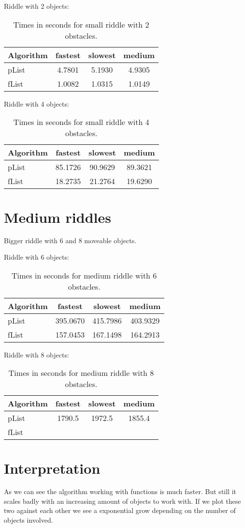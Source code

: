\begin{figure}[H]
\end{figure}
Riddle with 2 objects:
\begin{table}
\centering
\begin{tabular}{l||c|c|c|}
Algorithm& fastest & slowest & medium\\\hline
pList & 4.7801& 5.1930&4.9305\\
fList  & 1.0082 & 1.0315& 1.0149\\
\end{tabular}
\caption{Times in seconds for small riddle with 2 obstacles.}
\end{table}
Riddle with 4 objects:
\begin{table}
\centering
\begin{tabular}{l||c|c|c|}
Algorithm& fastest & slowest & medium\\\hline
pList & 85.1726 & 90.9629 & 89.3621\\
fList  & 18.2735 & 21.2764 & 19.6290\\
\end{tabular}
\caption{Times in seconds for small riddle with 4 obstacles.}
\end{table}

\section{Medium riddles}
Bigger riddle with 6 and 8 moveable objects.\\
\begin{figure}[H]
\end{figure}
Riddle with 6 objects:
\begin{table}
\centering
\begin{tabular}{l||c|c|c|}
Algorithm& fastest & slowest & medium\\\hline
pList &  395.0670 & 415.7986 & 403.9329\\
fList  &  157.0453 &  167.1498 & 164.2913\\
\end{tabular}
\caption{Times in seconds for medium riddle with 6 obstacles.}
\end{table}
Riddle with 8 objects:
\begin{table}
\centering
\begin{tabular}{l||c|c|c|}
Algorithm& fastest & slowest & medium\\\hline
pList & 1790.5 &1972.5 &1855.4\\
fList  & & &\\
\end{tabular}
\caption{Times in seconds for medium riddle with 8 obstacles.}
\end{table}

\section{Interpretation}
As we can see the algorithm working with functions is much faster. But still it scales badly with an increasing amount of objects to work with.
If we plot these two against each other we see a exponential grow depending on the number of objects involved.


